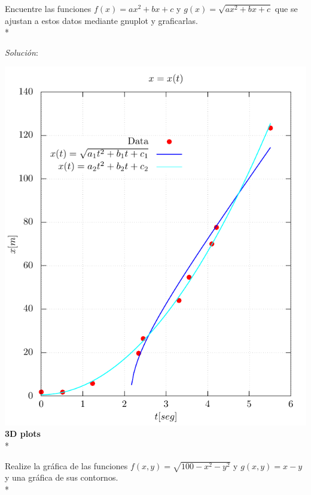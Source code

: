 \documentclass[11.5pt,a4paper]{article}
\begin{document}
Encuentre las funciones $f(x)=ax^2+bx+c$ y $g(x)=\sqrt{ax^2+bx+c}$ que se ajustan a estos datos mediante gnuplot y graficarlas.\\*

\textit{Solución}:

\includegraphics[scale=0.60]{ejercicio3.pdf}\\

\textbf{3D plots}\\*

Realize la gráfica de las funciones $f(x,y)=\sqrt{100-x^2-y^2}$ y $g(x,y)= x-y$ y una gráfica de sus contornos.\\*
\end{document}
